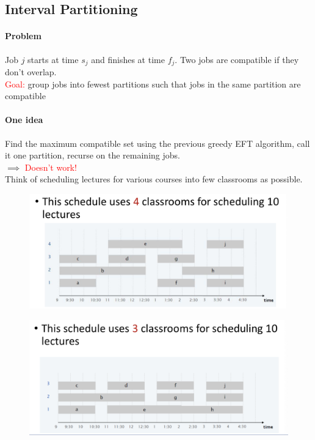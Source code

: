 \documentclass[11pt]{article}
\begin{document}
\subsection{Interval Partitioning}
\paragraph{Problem}
Job $j$ starts at time $s_j$ and finishes at time $f_j$. Two jobs are compatible if they don't overlap.\\
\textcolor{red}{Goal:} group jobs into fewest partitions such that jobs in the same partition are compatible

\paragraph{One idea}
Find the maximum compatible set using the previous greedy EFT algorithm, call it one partition, recurse on the remaining jobs. \\
$\implies$ \textcolor{red}{Doesn't work!} \\

\noindent Think of scheduling lectures for various courses into few classrooms as possible.

\begin{figure}[h]
	\centering
	\includegraphics[scale=0.6]{p10}
\end{figure}

\begin{figure}[h]
	\centering
	\includegraphics[scale=0.6]{p11}
\end{figure}
\end{document}
